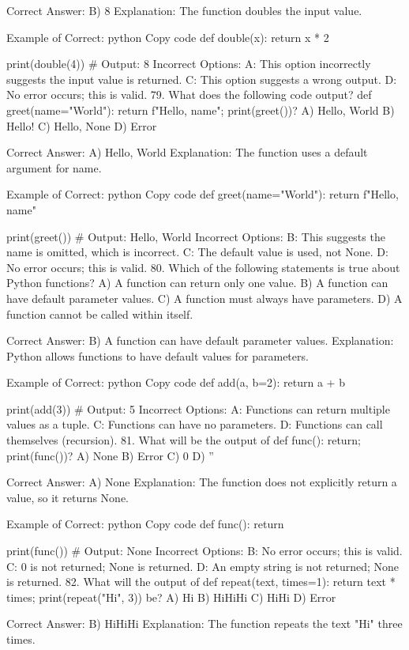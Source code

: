 Correct Answer: B) 8
Explanation: The function doubles the input value.

Example of Correct:
python
Copy code
def double(x):
    return x * 2

print(double(4))  # Output: 8
Incorrect Options:
A: This option incorrectly suggests the input value is returned.
C: This option suggests a wrong output.
D: No error occurs; this is valid.
79. What does the following code output? def greet(name="World"): return f"Hello, {name}"; print(greet())?
A) Hello, World
B) Hello!
C) Hello, None
D) Error

Correct Answer: A) Hello, World
Explanation: The function uses a default argument for name.

Example of Correct:
python
Copy code
def greet(name="World"):
    return f"Hello, {name}"

print(greet())  # Output: Hello, World
Incorrect Options:
B: This suggests the name is omitted, which is incorrect.
C: The default value is used, not None.
D: No error occurs; this is valid.
80. Which of the following statements is true about Python functions?
A) A function can return only one value.
B) A function can have default parameter values.
C) A function must always have parameters.
D) A function cannot be called within itself.

Correct Answer: B) A function can have default parameter values.
Explanation: Python allows functions to have default values for parameters.

Example of Correct:
python
Copy code
def add(a, b=2):
    return a + b

print(add(3))  # Output: 5
Incorrect Options:
A: Functions can return multiple values as a tuple.
C: Functions can have no parameters.
D: Functions can call themselves (recursion).
81. What will be the output of def func(): return; print(func())?
A) None
B) Error
C) 0
D) ''

Correct Answer: A) None
Explanation: The function does not explicitly return a value, so it returns None.

Example of Correct:
python
Copy code
def func():
    return

print(func())  # Output: None
Incorrect Options:
B: No error occurs; this is valid.
C: 0 is not returned; None is returned.
D: An empty string is not returned; None is returned.
82. What will the output of def repeat(text, times=1): return text * times; print(repeat("Hi", 3)) be?
A) Hi
B) HiHiHi
C) HiHi
D) Error

Correct Answer: B) HiHiHi
Explanation: The function repeats the text "Hi" three times.


